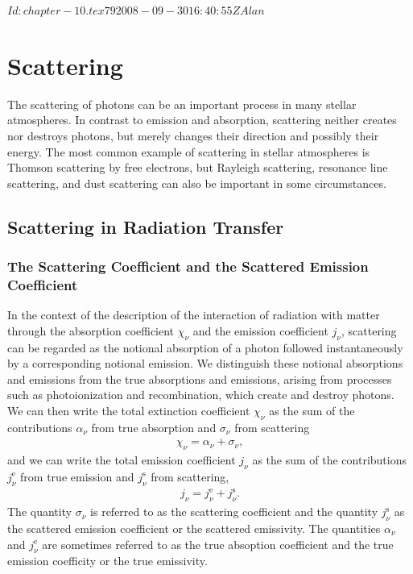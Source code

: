 
\svnInfo $Id: chapter-10.tex 79 2008-09-30 16:40:55Z Alan $

\chapter{Scattering}

The scattering of photons can be an important process in
many stellar atmospheres. In contrast to emission and
absorption, scattering neither creates nor destroys photons,
but merely changes their direction and possibly their
energy. The most common example of scattering in stellar
atmospheres is Thomson scattering by free electrons, but
Rayleigh scattering, resonance line scattering, and dust
scattering can also be important in some circumstances.



\section{Scattering in Radiation Transfer}

\subsection{The Scattering Coefficient and the Scattered
Emission Coefficient}

In the context of the description of the interaction of
radiation with matter through the absorption coefficient
$\chi_\nu$ and the emission coefficient $j_\nu$, scattering
can be regarded as the notional absorption of a photon
followed instantaneously by a corresponding notional
emission. We distinguish these notional absorptions and
emissions from the true absorptions and emissions, arising
from processes such as photoionization and recombination,
which create and destroy photons. We can then write the
total extinction coefficient $\chi_\nu$ as the sum of the
contributions $\alpha_\nu$ from true absorption and
$\sigma_\nu$ from scattering
\begin{align}
\chi_\nu = \alpha_\nu + \sigma_\nu,
\end{align}
and we can write the total emission coefficient $j_\nu$ as
the sum of the contributions $j_\nu^\mathrm{e}$ from true
emission and $j_\nu^\mathrm{s}$ from scattering,
\begin{align}
j_\nu = j_\nu^\mathrm{e} + j_\nu^\mathrm{s}.
\end{align}
The quantity $\sigma_\nu$ is referred to as the scattering
coefficient and the quantity $j_\nu^\mathrm{s}$ as the
scattered emission coefficient or the scattered emissivity.
The quantities $\alpha_\nu$ and $j_\nu^\mathrm{e}$ are
sometimes referred to as the true absoption coefficient and
the true emission coefficity or the true emissivity.

